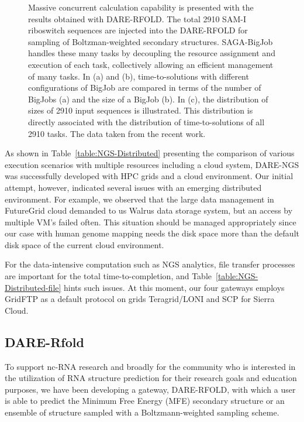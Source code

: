 \documentclass{sig-alternate}
\begin{document}
\begin{figure}
\caption{\small Massive concurrent calculation capability is presented with the results obtained with DARE-RFOLD. The total 2910 SAM-I riboswitch sequences are injected into the DARE-RFOLD for sampling of Boltzman-weighted secondary structures.  SAGA-BigJob handles these many tasks by decoupling the resource assignment and execution of each task, collectively allowing an efficient management of many tasks. In (a) and (b), time-to-solutions with different configurations of BigJob are compared in terms of the number of BigJobs (a) and the size of a BigJob (b).  In (c), the distribution of sizes of 2910 input sequences is illustrated.  This distribution is directly associated with the distribution of time-to-solutions of all 2910 tasks. The data taken from the recent work\cite{ccpe11}.}
  \label{fig:dare-rfold-result} 
\end{figure}

As shown in Table~\ref{table:NGS-Distributed} presenting the comparison of various execution scenarios with multiple resources including a cloud system, DARE-NGS was successfully developed with HPC grids and a cloud environment.  Our initial attempt, however, indicated several issues with an emerging distributed environment.  For example,  we observed that the large data management in FutureGrid cloud demanded to us Walrus data storage system, but an access by multiple VM's failed often.  This situation should be managed appropriately since our case with human genome mapping needs the disk space more than the default disk space of the current cloud environment.

For the data-intensive computation such as NGS analytics, file transfer processes are important for the total time-to-completion, and Table~\ref{table:NGS-Distributed-file} hints such issues.  At this moment, our four gateways employs GridFTP as a default protocol on grids Teragrid/LONI and SCP for Sierra Cloud.


\subsection{DARE-Rfold}
To support nc-RNA research and broadly for the community who is interested in the utilization of RNA structure prediction for their research goals and education purposes, we have been developing a gateway, DARE-RFOLD, with which a user is able to predict the Minimum Free Energy (MFE) secondary structure or an ensemble of structure sampled with a Boltzmann-weighted sampling scheme.  
\end{document}
